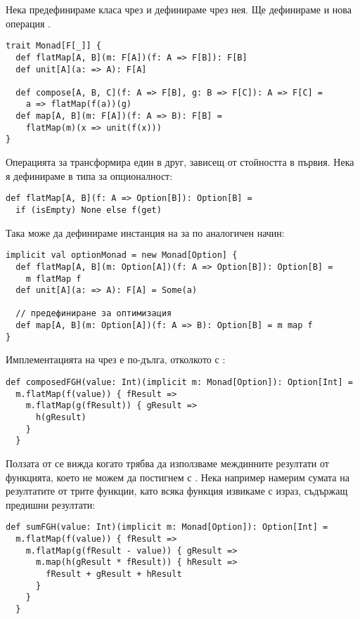 Нека предефинираме класа  чрез  и дефинираме  чрез нея. Ще дефинираме и нова операция .

\begin{lstlisting}
trait Monad[F[_]] {
  def flatMap[A, B](m: F[A])(f: A => F[B]): F[B]
  def unit[A](a: => A): F[A]

  def compose[A, B, C](f: A => F[B], g: B => F[C]): A => F[C] =
    a => flatMap(f(a))(g)
  def map[A, B](m: F[A])(f: A => B): F[B] =
    flatMap(m)(x => unit(f(x)))
}
\end{lstlisting}

Операцията  за  трансформира един  в друг, зависещ от стойността в първия. Нека я дефинираме в типа за опционалност:

\begin{lstlisting}
def flatMap[A, B](f: A => Option[B]): Option[B] =
  if (isEmpty) None else f(get)
\end{lstlisting}

Така може да дефинираме инстанция на  за  по аналогичен начин:

\begin{lstlisting}[texcl=true]
implicit val optionMonad = new Monad[Option] {
  def flatMap[A, B](m: Option[A])(f: A => Option[B]): Option[B] =
    m flatMap f
  def unit[A](a: => A): F[A] = Some(a)
  
  // предефиниране за оптимизация
  def map[A, B](m: Option[A])(f: A => B): Option[B] = m map f
}
\end{lstlisting}

Имплементацията на  чрез  е по-дълга, отколкото с :

\begin{lstlisting}
def composedFGH(value: Int)(implicit m: Monad[Option]): Option[Int] =
  m.flatMap(f(value)) { fResult =>
    m.flatMap(g(fResult)) { gResult =>
      h(gResult)
    }
  }
\end{lstlisting}

Ползата от  се вижда когато трябва да използваме междинните резултати от функцията, което не можем да постигнем с . Нека например намерим сумата на резултатите от трите функции, като всяка функция извикаме с израз, съдържащ предишни резултати:

\begin{lstlisting}
def sumFGH(value: Int)(implicit m: Monad[Option]): Option[Int] =
  m.flatMap(f(value)) { fResult =>
    m.flatMap(g(fResult - value)) { gResult =>
      m.map(h(gResult * fResult)) { hResult =>
        fResult + gResult + hResult
      }
    }
  }
\end{lstlisting}

